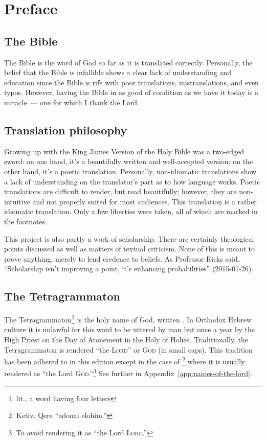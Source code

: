 \chapter{Preface}\thispagestyle{empty}
\section{The Bible}
The Bible is the word of God so far as it is translated correctly. Personally, the belief that the Bible is infallible shows a clear lack of understanding and education since the Bible is rife with poor translations, mistranslations, and even typos. However, having the Bible in as good of condition as we have it today is a miracle~--- one for which I thank the Lord.

\section{Translation philosophy}
Growing up with the King James Version of the Holy Bible was a two-edged sword: on one hand, it's a beautifully written and well-accepted version; on the other hand, it's a poetic translation. Personally, non-idiomatic translations show a lack of understanding on the translator's part as to how language works. Poetic translations are difficult to render, but read beautifully; however, they are non-intuitive and not properly suited for most audiences. This translation is a rather idiomatic translation. Only a few liberties were taken, all of which are marked in the footnotes.

This project is also partly a work of scholarship. There are certainly theological points discussed as well as matters of textual criticism. None of this is meant to prove anything, merely to lend credence to beliefs. As Professor Ricks said, ``Scholarship isn't improving a point, it's enhancing probabilities'' (2015-01-26).

\section{The Tetragrammaton}
The Tetragrammaton\footnote{lit., a word having four letters} is the holy name of God, written . In Orthodox Hebrew culture it is unlawful for this word to be uttered by man but once a year by the High Priest on the Day of Atonement in the Holy of Holies. Traditionally, the Tetragrammaton is rendered ``the \textsc{Lord}'' or \textsc{God} (in small caps). This tradition has been adhered to in this edition except in the case of \footnote{Ketiv. Qere ``adonai elohim.''} where it is usually rendered as ``the Lord \textsc{God}.''\footnote{To avoid rendering it as ``the Lord \textsc{Lord}.''} See further in Appendix~\ref{app:names-of-the-lord}.

